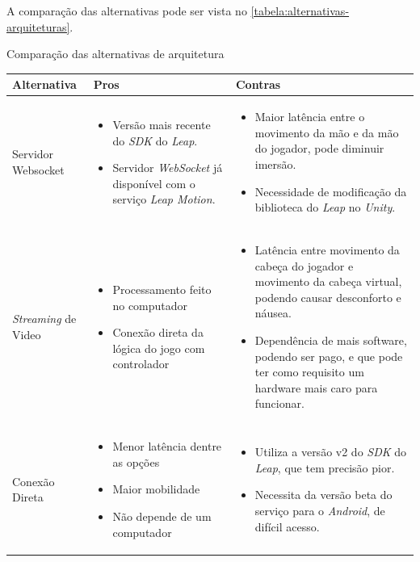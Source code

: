 A comparação das alternativas pode ser vista no \autoref{tabela:alternativas-arquiteturas}.

\begin{quadro}[htb] \scriptsize
	\centering
	\caption[Comparação das alternativas de arquitetura]{Comparação das alternativas de arquitetura}
		
	\begin{tabular}{|>{\centering\arraybackslash}m{2.1cm}|>{\centering\arraybackslash}m{6cm}|>{\centering\arraybackslash}m{6cm}|}
		\hline 
		\textbf{Alternativa} & \textbf{Pros} & \textbf{Contras} \\
		\hline 
		Servidor Websocket
		&\begin{itemize}[label={},leftmargin=1mm]
			\item Versão mais recente do \textit{SDK} do \textit{Leap}.
			\item Servidor \textit{WebSocket} já disponível com o serviço \textit{Leap Motion}.
		\end{itemize}
		&\begin{itemize}[label={},leftmargin=1mm]
			\item Maior latência entre o movimento da mão e da mão do jogador, pode diminuir imersão.
			\item Necessidade de modificação da biblioteca do \textit{Leap} no \textit{Unity}.
		\end{itemize}
		\\ \hline 
		\textit{Streaming} de Video
		&\begin{itemize}[label={},leftmargin=1mm]
			\item Processamento feito no computador
			\item Conexão direta da lógica do jogo com controlador
		\end{itemize}
		&\begin{itemize}[label={},leftmargin=1mm]
			\item Latência entre movimento da cabeça do jogador e movimento da cabeça virtual, podendo causar desconforto e náusea.
			\item Dependência de mais software, podendo ser pago, e que pode ter como requisito um hardware mais caro para funcionar.
		\end{itemize}
	    \\ \hline 
		Conexão Direta
		&\begin{itemize}[label={},leftmargin=1mm]
				\item Menor latência dentre as opções
				\item Maior mobilidade
				\item Não depende de um computador
			\end{itemize}
		&\begin{itemize}[label={},leftmargin=1mm]
				\item Utiliza a versão v2 do \textit{SDK} do \textit{Leap}, que tem precisão pior.
				\item Necessita da versão beta do serviço para o \textit{Android}, de difícil acesso.
			\end{itemize}
		\\ 
		\hline 
	\end{tabular} 


\end{quadro}
